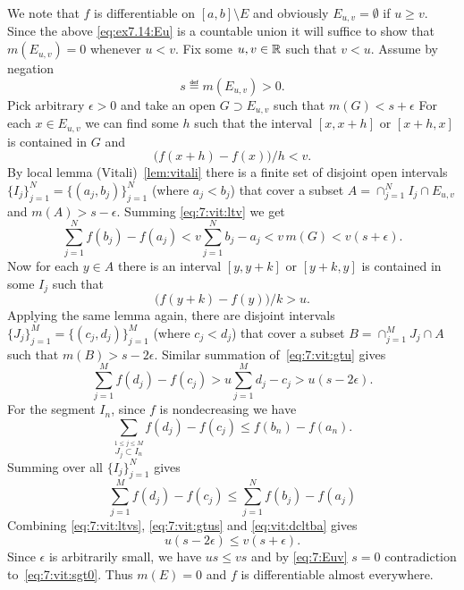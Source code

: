 \begin{thmproof}
We note that 
$f$ is differentiable on \([a,b]\setminus E\) 
and obviously \(E_{u,v} = \emptyset\) if \(u\geq v\).
Since the above \eqref{eq:ex7.14:Eu} is a countable union 
it will suffice to show that \(m(E_{u,v}) = 0\) whenever \(u < v\).
Fix some \(u,v\in\mathbb{R}\) such that \(v<u\).
Assume by negation 
\begin{equation} \label{eq:7:vit:sgt0}
s \eqdef m(E_{u,v}) > 0.
\end{equation}
Pick arbitrary \(\epsilon>0\) and take an open \(G \supset E_{u,v}\)
such that \(m(G) < s + \epsilon\)
For each \(x\in E_{u,v}\) we can find some $h$ such that
the interval \([x,x+h]\) or  \([x+h,x]\) is contained in $G$ and 
\begin{equation} \label{eq:7:vit:ltv}
\bigl(f(x+h) - f(x)\bigr)/h < v.
\end{equation}
By local lemma (Vitali)~\ref{lem:vitali} 
there is a finite set of disjoint open intervals 
\(\{I_j\}_{j=1}^N = \{(a_j,b_j)\}_{j=1}^N\) (where \(a_j<b_j\))
that 
cover a subset \(A = \cap_{j=1}^N I_j \cap  E_{u,v}\) 
and \(m(A) > s - \epsilon\). Summing \eqref{eq:7:vit:ltv} we get
\begin{equation} \label{eq:7:vit:ltvs}
\sum_{j=1}^N f(b_j) - f(a_j) 
< v\sum_{j=1}^N b_j - a_j < v\,m(G)  <  v(s+\epsilon).
\end{equation}
Now for each \(y\in A\) there is an interval
 \([y,y+k]\) or  \([y+k,y]\) is contained in some \(I_j\) such that 
\begin{equation} \label{eq:7:vit:gtu}
\bigl(f(y+k) - f(y)\bigr)/k > u.
\end{equation}
Applying the same lemma again, there are disjoint intervals
\(\{J_j\}_{j=1}^M = \{(c_j,d_j)\}_{j=1}^M\) (where \(c_j<d_j\))
that 
cover a subset \(B = \cap_{j=1}^M J_j \cap  A\) 
such that \(m(B) > s-2\epsilon\). 
Similar summation of~\eqref{eq:7:vit:gtu} gives
\begin{equation} \label{eq:7:vit:gtus}
\sum_{j=1}^M f(d_j) - f(c_j) > u \sum_{j=1}^M d_j - c_j >  u(s - 2\epsilon).
\end{equation}
For the segment \(I_n\), since $f$ is nondecreasing we have
\begin{equation*}
\sum_{\stackrel{1\leq j \leq M}{J_j \subset I_n}} f(d_j) - f(c_j) 
\leq f(b_n) - f(a_n).
\end{equation*}
Summing over all \(\{I_j\}_{j=1}^N\) gives
\begin{equation} \label{eq:vit:dcltba}
\sum_{j=1}^M f(d_j) - f(c_j) \leq \sum_{j=1}^N f(b_j) - f(a_j) 
\end{equation}
Combining 
\eqref{eq:7:vit:ltvs},
\eqref{eq:7:vit:gtus} and
\eqref{eq:vit:dcltba}
gives
\begin{equation*}
u(s - 2\epsilon) \leq v(s+\epsilon).
\end{equation*}
Since \(\epsilon\) is arbitrarily small, we have
\(us \leq vs\) and by \eqref{eq:7:Euv} \(s=0\) contradiction 
to~\eqref{eq:7:vit:sgt0}. Thus \(m(E)=0\) and $f$ is differentiable
almost everywhere.


\end{thmproof}
